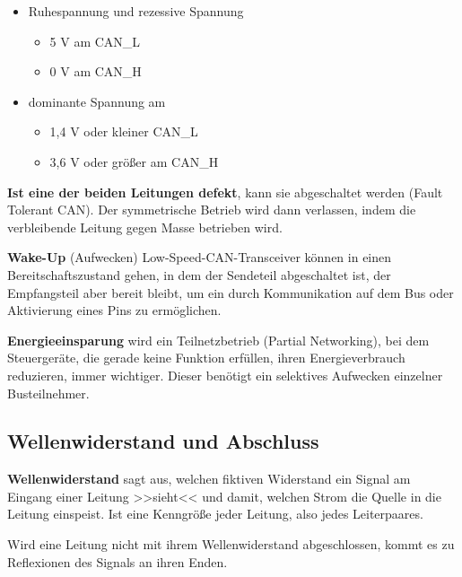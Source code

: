 \begin{itemize}
\item
  Ruhespannung und rezessive Spannung

  \begin{itemize}
  \item
    5 V am CAN\_L
  \item
    0 V am CAN\_H
  \end{itemize}
\item
  dominante Spannung am

  \begin{itemize}
  \item
    1,4 V oder kleiner CAN\_L
  \item
    3,6 V oder größer am CAN\_H
  \end{itemize}
\end{itemize}

\textbf{Ist eine der beiden Leitungen defekt}, kann sie abgeschaltet
werden (Fault Tolerant CAN). Der symmetrische Betrieb wird dann
verlassen, indem die verbleibende Leitung gegen Masse betrieben wird.

\textbf{Wake-Up} (Aufwecken) Low-Speed-CAN-Transceiver können in einen
Bereitschaftszustand gehen, in dem der Sendeteil abgeschaltet ist, der
Empfangsteil aber bereit bleibt, um ein durch Kommunikation auf dem Bus
oder Aktivierung eines Pins zu ermöglichen.

\textbf{Energieeinsparung} wird ein Teilnetzbetrieb (Partial
Networking), bei dem Steuergeräte, die gerade keine Funktion erfüllen,
ihren Energieverbrauch reduzieren, immer wichtiger. Dieser benötigt ein
selektives Aufwecken einzelner Busteilnehmer.

\newpage

\subsection{Wellenwiderstand und
Abschluss}\label{wellenwiderstand-und-abschluss}

\textbf{Wellenwiderstand} sagt aus, welchen fiktiven Widerstand ein
Signal am Eingang einer Leitung >>sieht<< und damit, welchen Strom die
Quelle in die Leitung einspeist. Ist eine Kenngröße jeder Leitung, also
jedes Leiterpaares.

Wird eine Leitung nicht mit ihrem Wellenwiderstand abgeschlossen, kommt
es zu Reflexionen des Signals an ihren Enden.

